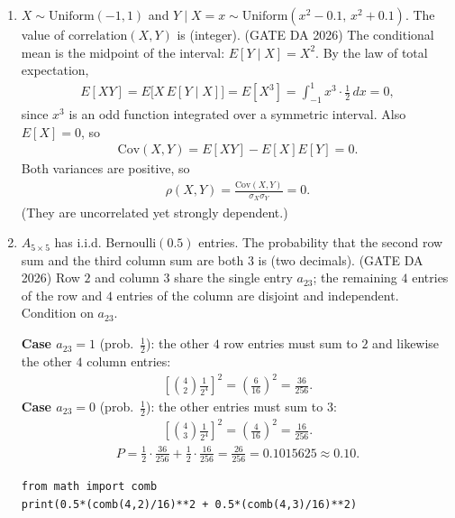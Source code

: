 \begin{enumerate}[label=\textbf{Q.\arabic*},leftmargin=*,start=1]
\item[\textbf{Q.63}] $X\sim\text{Uniform}(-1,1)$ and
$Y\mid X=x\sim\text{Uniform}(x^2-0.1,\,x^2+0.1)$. The value of
$\text{correlation}(X,Y)$ is \underline{\hspace{1.5cm}} (integer).
\hfill (GATE DA 2026)
\solution
The conditional mean is the midpoint of the interval: $E[Y\mid X]=X^2$. By the law of total
expectation,
\begin{align}
E[XY]=E\big[X\,E[Y\mid X]\big]=E[X^3]=\int_{-1}^{1}x^3\cdot\frac12\,dx=0,
\end{align}
since $x^3$ is an odd function integrated over a symmetric interval. Also $E[X]=0$, so
\begin{align}
\mathrm{Cov}(X,Y)=E[XY]-E[X]E[Y]=0 .
\end{align}
Both variances are positive, so
\begin{align}
\rho(X,Y)=\frac{\mathrm{Cov}(X,Y)}{\sigma_X\sigma_Y}=\boxed{0}.
\end{align}
(They are uncorrelated yet strongly dependent.)

\item[\textbf{Q.64}] $A_{5\times5}$ has i.i.d. Bernoulli$(0.5)$ entries. The
probability that the second row sum and the third column sum are both $3$ is
\underline{\hspace{1.5cm}} (two decimals).
\hfill (GATE DA 2026)
\solution
Row $2$ and column $3$ share the single entry $a_{23}$; the remaining $4$ entries of the row
and $4$ entries of the column are disjoint and independent. Condition on $a_{23}$.

\textbf{Case $a_{23}=1$} (prob.\ $\tfrac12$): the other $4$ row entries must sum to $2$ and likewise
the other $4$ column entries:
\begin{align}
\left[\binom42\frac1{2^4}\right]^2=\left(\frac{6}{16}\right)^2=\frac{36}{256}.
\end{align}
\textbf{Case $a_{23}=0$} (prob.\ $\tfrac12$): the other entries must sum to $3$:
\begin{align}
\left[\binom43\frac1{2^4}\right]^2=\left(\frac{4}{16}\right)^2=\frac{16}{256}.
\end{align}
\begin{align}
P=\frac12\cdot\frac{36}{256}+\frac12\cdot\frac{16}{256}=\frac{26}{256}=0.1015625\approx\boxed{0.10}.
\end{align}
\begin{lstlisting}
from math import comb
print(0.5*(comb(4,2)/16)**2 + 0.5*(comb(4,3)/16)**2)
\end{lstlisting}


\end{enumerate}
